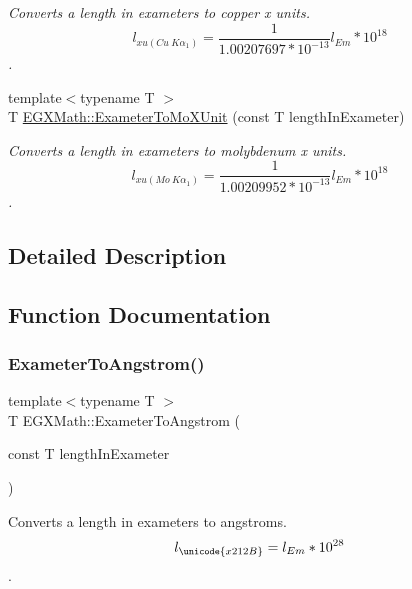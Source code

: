 \begin{DoxyCompactItemize}
\begin{DoxyCompactList}\small\item\em Converts a length in exameters to copper x units. \[ l_{xu(Cu\ K\alpha_1)}= \frac{1}{1.00207697*10^{-13}} l_{Em} * 10^{18}\]. \end{DoxyCompactList}\item 
{\footnotesize template$<$typename T $>$ }\\T \mbox{\hyperlink{group___e_g_x_math-_conversions-_length_conversions-_exameter-_non-_s_i_gadf73e46609660df6b7ae77ec7241183e}{E\+G\+X\+Math\+::\+Exameter\+To\+Mo\+X\+Unit}} (const T length\+In\+Exameter)
\begin{DoxyCompactList}\small\item\em Converts a length in exameters to molybdenum x units. \[ l_{xu(Mo\ K\alpha_1)}=\frac{1}{1.00209952*10^{-13}} l_{Em} * 10^{18}\]. \end{DoxyCompactList}\end{DoxyCompactItemize}


\subsection{Detailed Description}


\subsection{Function Documentation}
\mbox{\label{group___e_g_x_math-_conversions-_length_conversions-_exameter-_non-_s_i_ga24d2ee057470ce37f99d31451e010a22}} 
\subsubsection{\texorpdfstring{Exameter\+To\+Angstrom()}{ExameterToAngstrom()}}
{\footnotesize\ttfamily template$<$typename T $>$ \\
T E\+G\+X\+Math\+::\+Exameter\+To\+Angstrom (\begin{DoxyParamCaption}\item[{const T}]{length\+In\+Exameter }\end{DoxyParamCaption})}



Converts a length in exameters to angstroms. \[ l_{\unicode{x212B}}=l_{Em} * 10^{28} \]. 

